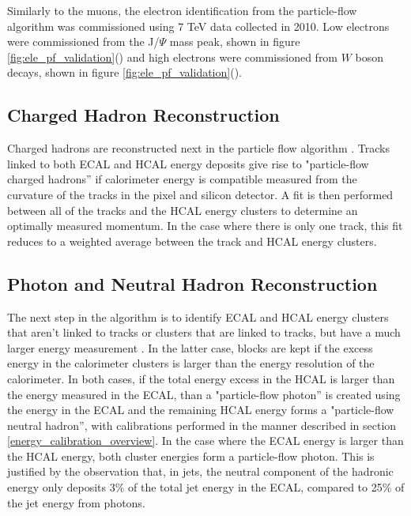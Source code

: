 \par Similarly to the muons, the electron identification from the
particle-flow algorithm was commissioned using 7 TeV data collected in
2010.  Low \PT electrons were commissioned from the J/$\Psi$ mass
peak, shown in figure
\ref{fig:ele_pf_validation}() and high \PT
electrons were commissioned from $W$ boson decays, shown in figure
\ref{fig:ele_pf_validation}(). 

\subsection{Charged Hadron Reconstruction}
\label{charged_hadron_reco_overview}

\par Charged hadrons are reconstructed next in the particle flow
algorithm \cite{CMS-PAS-PFT-09-001}.  Tracks linked to both ECAL and
HCAL energy deposits give rise to "particle-flow charged hadrons'' if
calorimeter energy is compatible measured from the curvature of the
tracks in the pixel and silicon detector.  A fit is then performed
between all of the tracks and the HCAL energy clusters to determine an
optimally measured momentum.  In the case where there is only one
track, this fit reduces to a weighted average between the track and
HCAL energy clusters.  

\subsection{Photon and Neutral Hadron Reconstruction}
\label{neutral_hadron_reco_overview}

\par The next step in the algorithm is to identify ECAL and HCAL
energy clusters that aren't linked to tracks or clusters that are
linked to tracks, but have a much larger energy measurement
.  In the latter case, blocks are kept if the
excess energy in the calorimeter clusters is larger than the energy
resolution of the calorimeter.  In both cases, if the total energy
excess in the HCAL is larger than the energy measured in the ECAL,
than a "particle-flow photon'' is created using the energy in the ECAL
and the remaining HCAL energy forms a "particle-flow neutral hadron'',
with calibrations performed in the manner described in
section \ref{energy_calibration_overview}.  In the case where the ECAL
energy  is larger than the HCAL energy, both cluster energies form a
particle-flow photon.  This is justified by the observation that, in jets,
the neutral component of the hadronic energy only deposits 3$\%$ of
the total jet energy in the ECAL, compared to 25$\%$ of the jet energy
from photons.   


